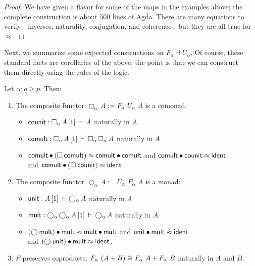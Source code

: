 \documentclass{drl-common/llncs}
\newcommand{\la}{\ensuremath{\dashv}}
\newcommand\F[2]{\ensuremath{F_{#1} \,\, #2}}
\newcommand\U[2]{\ensuremath{U_{#1} \,\, #2}}
\newcommand\coprd[2]{\ensuremath{#1 + #2}}
\newcommand\seq[3]{\ensuremath{#1 \, [ #2 ] \, \vdash \, #3}}
\newcommand\ident[1]{\ensuremath{\dsd{ident}_{#1}}}
\newcommand\cuti{\ensuremath{\bullet}}
\newcommand\ap[2]{\ensuremath{#1 \approx #2}}
\newcommand\Bx[2]{\ensuremath{\Box_{#1} \, {#2}}}
\newcommand\Crc[2]{\ensuremath{\bigcirc_{#1} \, {#2}}}
\begin{document}
\begin{proof}
We have given a flavor for some of the maps in the examples above; the
complete construction is about 500 lines of Agda.  There are many
equations to verify---inverses, naturality, conjugation, and
coherence---but they are all true for \ap{}{}.
\end{proof}

Next, we summarize some expected constructions on $F_\alpha \la
U_\alpha$.  Of course, these standard facts are corollaries of the
above; the point is that we can construct them directly using the rules of the logic.

\begin{lemma} \label{lem:constructionsonadjunctions}
Let $\alpha : q \ge p$.  Then:
\begin{enumerate}
\item The composite functor $\Bx{\alpha}{A} := \F{\alpha}{\U{\alpha}{A}}$ is a comonad:
\begin{itemize}
\item[] $\dsd{counit} : \seq{\Bx \alpha A}{1}{A}$ naturally in $A$
\item[] $\dsd{comult} : \seq{\Bx \alpha A}{1}{\Bx \alpha {\Bx \alpha A}}$
  naturally in $A$
\item[] 
 \ap{\dsd{comult} \cuti (\Bx{}{\dsd{comult}})}{\dsd{comult} \cuti
   \dsd{comult}}
and \ap{\dsd{comult} \cuti \dsd{counit}}{\ident{}} \\
and \ap{\dsd{comult} \cuti (\Bx{}{\dsd{counit}})}{\ident{}}.  
\end{itemize}

\item The composite functor $\Crc{\alpha}{A} := \U{\alpha}{\F{\alpha}{A}}$ is a monad:
\begin{itemize}
\item[] $\dsd{unit} : \seq{A}{1}{\Crc \alpha A}$ naturally in $A$
\item[] $\dsd{mult} : \seq{\Crc \alpha {\Crc \alpha A}}{1}{\Crc \alpha A}$
  naturally in $A$
\item[] 
 \ap{(\Crc{}{\dsd{mult}}) \cuti \dsd{mult} }{\dsd{mult} \cuti
   \dsd{mult}}
and \ap{\dsd{unit} \cuti \dsd{mult}}{\ident{}} \\
and \ap{(\Crc{}{\dsd{unit}}) \cuti \dsd{mult}}{\ident{}}.  
\end{itemize}

\item $F$ preserves coproducts: $\F \alpha (\coprd A B) \iso \coprd {\F
  \alpha A} {\F \alpha B}$ naturally in $A$ and $B$.
\end{enumerate}
\end{lemma}
\end{document}
